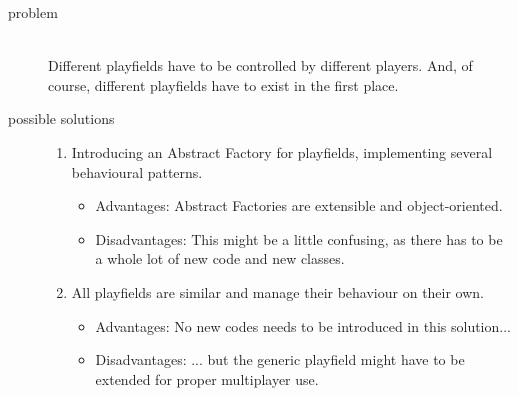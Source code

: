 \begin{description}
  \item[problem] ~\\ \hfill
    Different playfields have to be controlled by different players. And, of course, different playfields have to exist in the first place.
  \item[possible solutions] \hfill

    \begin{enumerate}
      \item Introducing an Abstract Factory for playfields, implementing several behavioural patterns.
      \begin{itemize}
        \item Advantages: Abstract Factories are extensible and object-oriented.
        \item Disadvantages: This might be a little confusing, as there has to be a whole lot of new code and new classes.
      \end{itemize}

      \item All playfields are similar and manage their behaviour on their own.
      \begin{itemize}
        \item Advantages: No new codes needs to be introduced in this solution...
        \item Disadvantages: ... but the generic playfield might have to be extended for proper multiplayer use.
      \end{itemize}
    \end{enumerate}
%
\end{description}